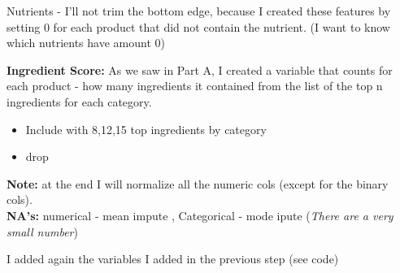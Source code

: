 \documentclass[
]{article}
\newenvironment{Shaded}{\begin{snugshade}}{\end{snugshade}}
\newcommand{\CommentTok}[1]{\textcolor[rgb]{0.56,0.35,0.01}{\textit{#1}}}
\newcommand{\ControlFlowTok}[1]{\textcolor[rgb]{0.13,0.29,0.53}{\textbf{#1}}}
\newcommand{\DataTypeTok}[1]{\textcolor[rgb]{0.13,0.29,0.53}{#1}}
\newcommand{\DecValTok}[1]{\textcolor[rgb]{0.00,0.00,0.81}{#1}}
\newcommand{\FloatTok}[1]{\textcolor[rgb]{0.00,0.00,0.81}{#1}}
\newcommand{\KeywordTok}[1]{\textcolor[rgb]{0.13,0.29,0.53}{\textbf{#1}}}
\newcommand{\NormalTok}[1]{#1}
\newcommand{\OperatorTok}[1]{\textcolor[rgb]{0.81,0.36,0.00}{\textbf{#1}}}
\newcommand{\StringTok}[1]{\textcolor[rgb]{0.31,0.60,0.02}{#1}}
\providecommand{\tightlist}{%
  \setlength{\itemsep}{0pt}\setlength{\parskip}{0pt}}
\begin{document}
Nutrients - I'll not trim the bottom edge, because I created these
features by setting 0 for each product that did not contain the
nutrient. (I want to know which nutrients have amount 0)

\textbf{Ingredient Score:} As we saw in Part A, I created a variable
that counts for each product - how many ingredients it contained from
the list of the top n ingredients for each category.

\begin{itemize}
\tightlist
\item
  Include with 8,12,15 top ingredients by category
\item
  drop
\end{itemize}

\textbf{Note:} at the end I will normalize all the numeric cols (except
for the binary cols).\\
\textbf{NA's:} numerical - mean impute , Categorical - mode ipute
(\emph{There are a very small number})

I added again the variables I added in the previous step (see code)

\begin{Shaded}
\end{Shaded}
\end{document}

